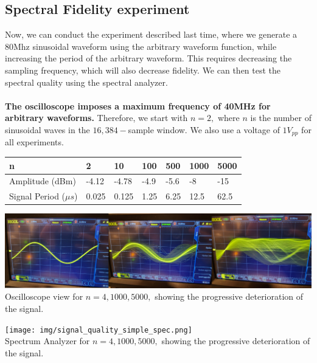 \documentclass{article}
\begin{document}
    \subsection*{Spectral Fidelity experiment}
    Now, we can conduct the experiment described last time, where we generate a 80Mhz sinusoidal waveform using the arbitrary waveform function, while increasing the period of the arbitrary waveform. This requires decreasing the sampling frequency, which will also decrease fidelity. We can then test the spectral quality using the spectral analyzer.\\\\
    \textbf{The oscilloscope imposes a maximum frequency of 40MHz for arbitrary waveforms.} Therefore, we start with $n=2,$ where $n$ is the number of sinusoidal waves in the $16,384-$sample window. We also use a voltage of $1V_{pp}$ for all experiments.
    \begin{table}[H]
    \centering
    \begin{tabular}{|l|l|l|l|l|l|l|}
    \hline
    n & 2 & 10 & 100 & 500 & 1000 & 5000 \\ \hline
    Amplitude (dBm) & -4.12 & -4.78 & -4.9 & -5.6 & -8 & -15 \\ \hline
    Signal Period ($\mu s$) & 0.025 & 0.125 & 1.25 & 6.25 & 12.5 & 62.5 \\ \hline
    \end{tabular}
    \end{table}
    \begin{mdframed}[backgroundcolor=gray!20, align = center, userdefinedwidth = 6in]
    \includegraphics[width = 5.8in]{img/signal_quality_simple.png}\\
    Oscilloscope view for $n = 4, 1000, 5000,$ showing the progressive deterioration of the signal.
    \end{mdframed}
    \newpage
    \begin{mdframed}[backgroundcolor=gray!20, align = center, userdefinedwidth = 6in]
    \texttt{[image: img/signal\_quality\_simple\_spec.png]}\\
    Spectrum Analyzer for $n = 4, 1000, 5000,$ showing the progressive deterioration of the signal.
    \end{mdframed}
\end{document}
